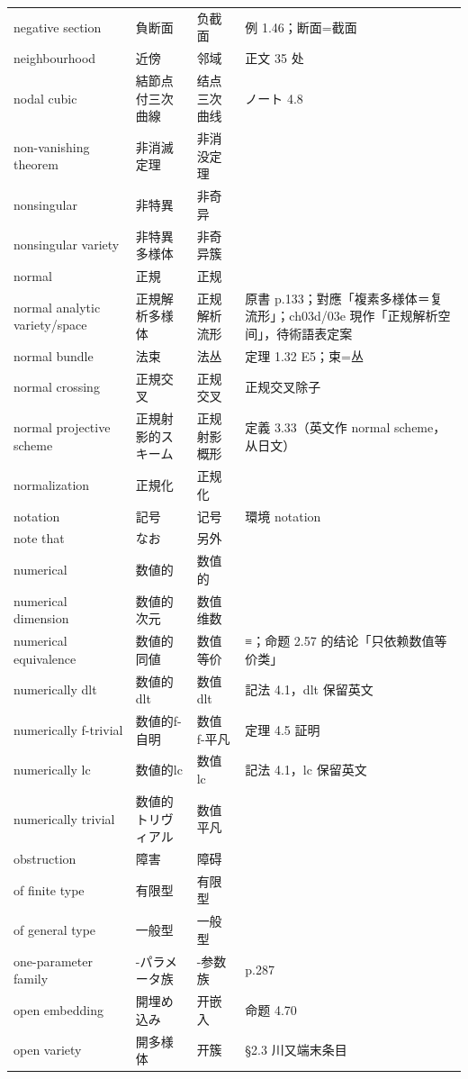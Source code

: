 \begin{longtable}{@{}>{\raggedright\arraybackslash}p{}>{\raggedright\arraybackslash}p{}>{\raggedright\arraybackslash}p{}>{\raggedright\arraybackslash}p{}@{}}
negative section & 負断面 & 负截面 & 例 1.46；断面=截面 \\
neighbourhood & 近傍 & 邻域 & 正文 35 处 \\
nodal cubic & 結節点付三次曲線 & 结点三次曲线 & ノート 4.8 \\
non-vanishing theorem & 非消滅定理 & 非消没定理 &  \\
nonsingular & 非特異 & 非奇异 &  \\
nonsingular variety & 非特異多様体 & 非奇异簇 &  \\
normal & 正規 & 正规 &  \\
normal analytic variety/space & 正規解析多様体 & 正规解析流形 & 原書 p.133；對應「複素多様体＝复流形」；ch03d/03e 現作「正规解析空间」，待術語表定案 \\
normal bundle & 法束 & 法丛 & 定理 1.32 E5；束=丛 \\
normal crossing & 正規交叉 & 正规交叉 & 正规交叉除子 \\
normal projective scheme & 正規射影的スキーム & 正规射影概形 & 定義 3.33（英文作 normal scheme，从日文） \\
normalization & 正規化 & 正规化 &  \\
notation & 記号 & 记号 & 環境 notation \\
note that & なお & 另外 &  \\
numerical & 数値的 & 数值的 &  \\
numerical dimension & 数値的次元 & 数值维数 &  \\
numerical equivalence & 数値的同値 & 数值等价 & ≡；命题 2.57 的结论「只依赖数值等价类」 \\
numerically dlt & 数値的dlt & 数值 dlt & 記法 4.1，dlt 保留英文 \\
numerically f-trivial & 数値的f-自明 & 数值 f-平凡 & 定理 4.5 証明 \\
numerically lc & 数値的lc & 数值 lc & 記法 4.1，lc 保留英文 \\
numerically trivial & 数値的トリヴィアル & 数值平凡 &  \\
obstruction & 障害 & 障碍 &  \\
of finite type & 有限型 & 有限型 &  \\
of general type & 一般型 & 一般型 &  \\
one-parameter family & 1-パラメータ族 & 1-参数族 & p.287 \\
open embedding & 開埋め込み & 开嵌入 & 命题 4.70 \\
open variety & 開多様体 & 开簇 & §2.3 川又端末条目 \\

\end{longtable}
